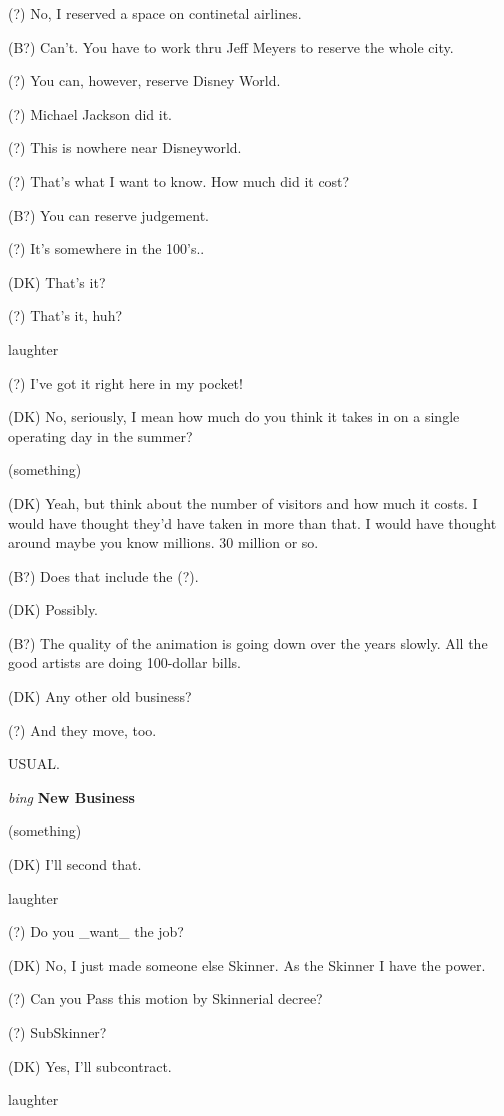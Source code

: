 (?) No, I reserved a space on continetal airlines.

(B?) Can't.  You have to work thru Jeff Meyers to reserve the whole
city.

(?) You can, however, reserve Disney World.

(?) Michael Jackson did it.

(?) This is nowhere near Disneyworld.

(?) That's what I want to know.  How much did it cost?

(B?) You can reserve judgement.

(?) It's somewhere in the 100's..

(DK) That's it?

(?) That's it, huh?

laughter

(?) I've got it right here in my pocket!

(DK) No, seriously, I mean how much do you think it takes in on a single
operating day in the summer?

(something)

(DK) Yeah, but think about the number of visitors and how much it costs.
I would have thought they'd have taken in more than that.  I would have
thought around maybe you know millions.  30 million or so.

(B?) Does that include the (?).

(DK) Possibly.

(B?) The quality of the animation is going down over the years slowly.
All the good artists are doing 100-dollar bills.

(DK) Any other old business?

(?) And they move, too.

USUAL.

\vspace{0.15in}
{\em bing\/} {\bf New Business\/}

(something)

(DK) I'll second that.

laughter

(?) Do you _want_ the job?

(DK) No, I just made someone else Skinner.  As the Skinner I have the
power.

(?) Can you Pass this motion by Skinnerial decree?

(?) SubSkinner?

(DK) Yes, I'll subcontract.

laughter

